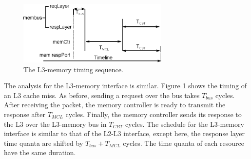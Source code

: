 
\begin{figure}
    \begin{center}
        \includegraphics[width=2.9475in]{figs/miss_timing.eps}
        \caption{The L3-memory timing sequence.}
        \label{fig:miss_timing}
    \end{center}
\end{figure}

The analysis for the L3-memory interface is similar. Figure 
\ref{fig:miss_timing} shows the timing of an L3 cache miss. As before, sending 
a request over the bus takes $T_{bus}$ cycles. After receiving the packet, the 
memory controller is ready to transmit the response after $T_{MCL}$ cycles. 
Finally, the memory controller sends its response to the L3 over the L3-memory
bus in $T_{CBT}$ cycles. The schedule for the L3-memory interface is similar to 
that of the L2-L3 interface, except here, the response layer time quanta are 
shifted by $T_{bus}+T_{MCL}$ cycles. The time quanta of each 
resource have the same duration.


